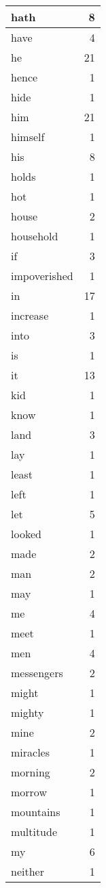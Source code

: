 \begin{center}
\begin{longtable}{l|r}
hath & 8\\ \hline 
have & 4\\ \hline 
he & 21\\ \hline 
hence & 1\\ \hline 
hide & 1\\ \hline 
him & 21\\ \hline 
himself & 1\\ \hline 
his & 8\\ \hline 
holds & 1\\ \hline 
hot & 1\\ \hline 
house & 2\\ \hline 
household & 1\\ \hline 
if & 3\\ \hline 
impoverished & 1\\ \hline 
in & 17\\ \hline 
increase & 1\\ \hline 
into & 3\\ \hline 
is & 1\\ \hline 
it & 13\\ \hline 
kid & 1\\ \hline 
know & 1\\ \hline 
land & 3\\ \hline 
lay & 1\\ \hline 
least & 1\\ \hline 
left & 1\\ \hline 
let & 5\\ \hline 
looked & 1\\ \hline 
made & 2\\ \hline 
man & 2\\ \hline 
may & 1\\ \hline 
me & 4\\ \hline 
meet & 1\\ \hline 
men & 4\\ \hline 
messengers & 2\\ \hline 
might & 1\\ \hline 
mighty & 1\\ \hline 
mine & 2\\ \hline 
miracles & 1\\ \hline 
morning & 2\\ \hline 
morrow & 1\\ \hline 
mountains & 1\\ \hline 
multitude & 1\\ \hline 
my & 6\\ \hline 
neither & 1\\ \hline 

\end{longtable}
\end{center}
